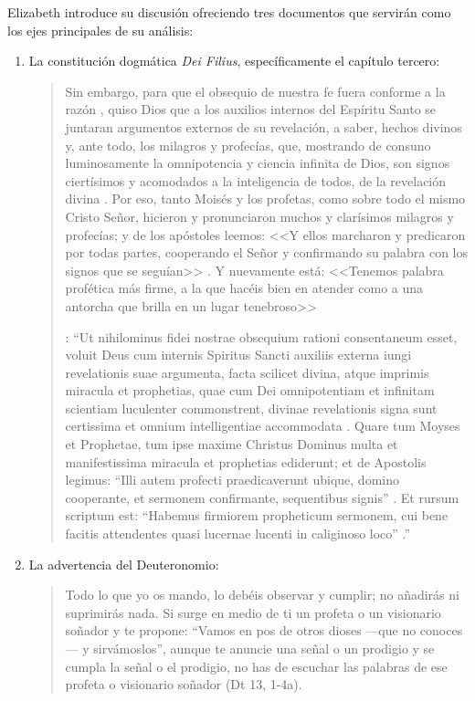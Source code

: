 Elizabeth introduce su discusión ofreciendo tres documentos que servirán como los ejes principales de su análisis:
\begin{enumerate}
\item La constitución dogmática \emph{Dei Filius}, específicamente el capítulo tercero: \blockquote[{\cite[\S\,3009]{vati1870df}}: \enquote{Ut nihilominus fidei nostrae obsequium rationi consentaneum  esset, voluit Deus cum internis Spiritus Sancti auxiliis externa iungi revelationis suae argumenta, facta scilicet divina, atque imprimis miracula et prophetias, quae cum Dei omnipotentiam et infinitam scientiam luculenter commonstrent, divinae revelationis signa sunt certissima et omnium intelligentiae accommodata . Quare tum Moyses et Prophetae, tum ipse maxime Christus Dominus multa et manifestissima miracula et prophetias ediderunt; et de Apostolis legimus: ``Illi autem profecti praedicaverunt ubique, domino cooperante, et sermonem confirmante, sequentibus signis'' . Et rursum scriptum est: ``Habemus firmiorem propheticum sermonem, cui bene facitis attendentes quasi lucernae lucenti in caliginoso loco'' .}]{Sin embargo, para que el obsequio de nuestra fe fuera conforme a la razón , quiso Dios que a los auxilios internos del Espíritu Santo se juntaran argumentos externos de su revelación, a saber, hechos divinos y, ante todo, los milagros y profecías, que, mostrando de consuno luminosamente la omnipotencia y ciencia infinita de Dios, son signos ciertísimos y acomodados a la inteligencia de todos, de la revelación divina . Por eso, tanto Moisés y los profetas, como sobre todo el mismo Cristo Señor, hicieron y pronunciaron muchos y clarísimos milagros y profecías; y de los apóstoles leemos: <<Y ellos marcharon y predicaron por todas partes, cooperando el Señor y confirmando su palabra con los signos que se seguían>> . Y nuevamente está: <<Tenemos palabra profética más firme, a la que hacéis bien en atender como a una antorcha que brilla en un lugar tenebroso>> }.
\item La advertencia del Deuteronomio: \blockquote{Todo lo que yo os mando, lo debéis observar y cumplir; no añadirás ni suprimirás nada. Si surge en medio de ti un profeta o un visionario soñador y te propone: \enquote{Vamos en pos de otros dioses ---que no conoces--- y sirvámoslos}, aunque te anuncie una señal o un prodigio y se cumpla la señal o el prodigio, no has de escuchar las palabras de ese profeta o visionario soñador (Dt 13, 1-4a).}

\end{enumerate}
